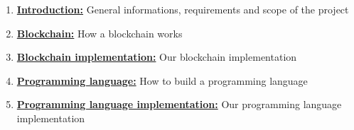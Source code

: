 \documentclass[../documentation.tex]{subfiles}
\begin{document}
\begin{enumerate}
    \item \hyperlink{section.1}{\textbf{Introduction:}}
        General informations, requirements and scope of the project
    
    \item \hyperlink{section.2}{\textbf{Blockchain:}}
        How a blockchain works
    
    \item \hyperlink{section.3}{\textbf{Blockchain implementation:}}
        Our blockchain implementation

    \item \hyperlink{section.4}{\textbf{Programming language:}}
        How to build a programming language

    \item \hyperlink{section.5}{\textbf{Programming language implementation:}}
        Our programming language implementation
\end{enumerate}
\end{document}

